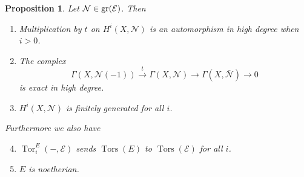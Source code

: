 \documentclass{amsproc}
\def\Escr{{\mathcal E}}
\def\Nscr{{\mathcal N}}
\def\gr{\mathop{\text{gr}}}
\def\Tors{\operatorname{Tors}}
\def\gr{\operatorname {gr}}
\def\Tor{\operatorname {Tor}}
\def\gr{\operatorname {gr}}
\def\Tors{\operatorname {Tors}}
\def\r{\rightarrow}
\let\oldtext\text
\def\text#1{\oldtext{\upshape #1}}
\newtheorem{propositions}[lemmas]{Proposition}
\theoremstyle{definition}
\theoremstyle{remark}
\numberwithin{equation}{section}
\numberwithin{table}{section}
\numberwithin{figure}{section}
\def\gr{\mathop{\text{gr}}}
\begin{document}
 \begin{propositions} 
\label{ref:9.1.3a}
Let
 $\Nscr\in \gr(\Escr)$.  
 Then 
 \begin{enumerate}
\item Multiplication by $t$ on $H^i(X,\Nscr)$ is an automorphism  in high 
degree when $i>0$.
\item
The complex
\[
\Gamma(X,\Nscr(-1))\xrightarrow{t} \Gamma(X,\Nscr)\r
\Gamma(X,\bar{\Nscr})\r 0
\]
is exact in high degree.
\item $H^i(X,\Nscr)$ is finitely generated for all $i$.
\end{enumerate}
Furthermore we also have
\begin{enumerate}
\setcounter{enumi}{3}
\item $\Tor^E_i(-,\Escr)$ sends $\Tors(E)$ to $\Tors(\Escr)$ for all $i$.
 \item $E$ is noetherian.
\end{enumerate}
\end{propositions}
\end{document}
